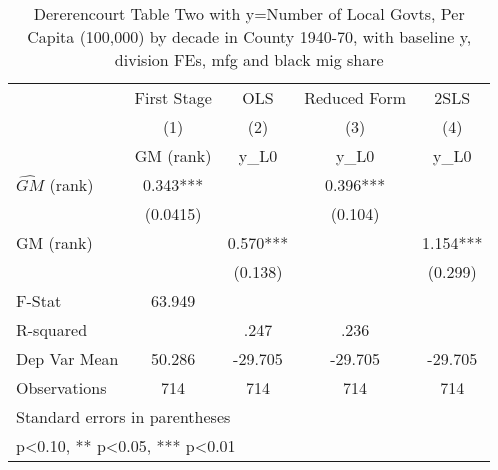 \begin{table}[htbp]\centering
\def\sym#1{\ifmmode^{#1}\else\(^{#1}\)\fi}
\caption{Dererencourt Table Two with y=Number of Local Govts, Per Capita (100,000) by decade in County 1940-70, with baseline y, division FEs, mfg and black mig share}
\begin{tabular}{l*{4}{c}}
\toprule
                    & First Stage   &         OLS   &Reduced Form   &        2SLS   \\
                    &\multicolumn{1}{c}{(1)}&\multicolumn{1}{c}{(2)}&\multicolumn{1}{c}{(3)}&\multicolumn{1}{c}{(4)}\\
                    &\multicolumn{1}{c}{GM  (rank)}&\multicolumn{1}{c}{y\_L0}&\multicolumn{1}{c}{y\_L0}&\multicolumn{1}{c}{y\_L0}\\
\midrule
$\hat{GM}$ (rank)   &       0.343***&               &       0.396***&               \\
                    &    (0.0415)   &               &     (0.104)   &               \\
\addlinespace
GM  (rank)          &               &       0.570***&               &       1.154***\\
                    &               &     (0.138)   &               &     (0.299)   \\
\midrule
F-Stat              &      63.949   &               &               &               \\
R-squared           &               &        .247   &        .236   &               \\
Dep Var Mean        &      50.286   &     -29.705   &     -29.705   &     -29.705   \\
Observations        &         714   &         714   &         714   &         714   \\
\bottomrule
\multicolumn{5}{l}{\footnotesize Standard errors in parentheses}\\
\multicolumn{5}{l}{\footnotesize * p<0.10, ** p<0.05, *** p<0.01}\\
\end{tabular}
\end{table}
